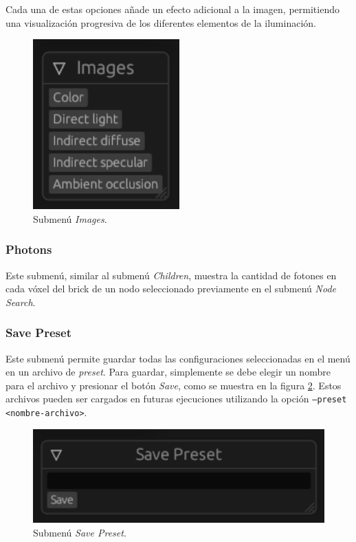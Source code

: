 Cada una de estas opciones añade un efecto adicional a la imagen, permitiendo una visualización progresiva de los diferentes elementos de la iluminación.

\begin{figure}[h]
    \centering
    \includegraphics[width=.5\textwidth]{images.png}
    \caption{Submenú \textit{Images}.}
    \label{fig:images}
\end{figure}

\subsubsection{Photons}

Este submenú, similar al submenú \textit{Children}, muestra la cantidad de fotones en cada vóxel del brick de un nodo seleccionado previamente en el submenú \textit{Node Search}.

\subsubsection{Save Preset}

Este submenú permite guardar todas las configuraciones seleccionadas en el menú en un archivo de \textit{preset}.
Para guardar, simplemente se debe elegir un nombre para el archivo y presionar el botón \textit{Save}, como se muestra en la figura \ref{fig:save_preset}.
Estos archivos pueden ser cargados en futuras ejecuciones utilizando la opción \texttt{--preset <nombre-archivo>}.

\begin{figure}[h]
    \centering
    \includegraphics[width=.5\textwidth]{save_preset.png}
    \caption{Submenú \textit{Save Preset}.}
    \label{fig:save_preset}
\end{figure}

